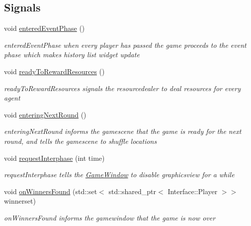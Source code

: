 \subsection*{Signals}
\begin{DoxyCompactItemize}
\item 
void \hyperlink{class_logic_a6e1e8882f6c7ca631882020fd852913e}{entered\-Event\-Phase} ()
\begin{DoxyCompactList}\small\item\em entered\-Event\-Phase when every player has passed the game proceeds to the event phase which makes history list widget update \end{DoxyCompactList}\item 
void \hyperlink{class_logic_a559f80e48e71f7e7c214d8b03e0a1b10}{ready\-To\-Reward\-Resources} ()
\begin{DoxyCompactList}\small\item\em ready\-To\-Reward\-Resources signals the resourcedealer to deal resources for every agent \end{DoxyCompactList}\item 
void \hyperlink{class_logic_a8d11ba8efc65dc62dcf95b93b042d422}{entering\-Next\-Round} ()
\begin{DoxyCompactList}\small\item\em entering\-Next\-Round informs the gamescene that the game is ready for the next round, and tells the gamescene to shuffle locations \end{DoxyCompactList}\item 
void \hyperlink{class_logic_a85f2736c83fcf1f59dc844de5a165e36}{request\-Interphase} (int time)
\begin{DoxyCompactList}\small\item\em request\-Interphase tells the \hyperlink{class_game_window}{Game\-Window} to disable graphicsview for a while \end{DoxyCompactList}\item 
void \hyperlink{class_logic_ad7243d4c58db75ae3eb74121607df5c4}{on\-Winners\-Found} (std\-::set$<$ std\-::shared\-\_\-ptr$<$ Interface\-::\-Player $>$$>$ winnerset)
\begin{DoxyCompactList}\small\item\em on\-Winners\-Found informs the gamewindow that the game is now over \end{DoxyCompactList}\end{DoxyCompactItemize}
